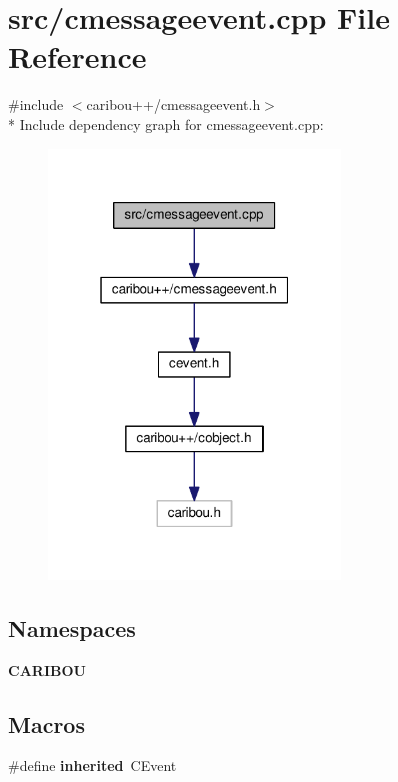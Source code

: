 \section{src/cmessageevent.cpp File Reference}
\label{cmessageevent_8cpp}
{\ttfamily \#include $<$caribou++/cmessageevent.\-h$>$}\\*
Include dependency graph for cmessageevent.\-cpp\-:\nopagebreak
\begin{figure}[H]
\begin{center}
\leavevmode
\includegraphics[width=220pt]{cmessageevent_8cpp__incl}
\end{center}
\end{figure}
\subsection*{Namespaces}
\begin{DoxyCompactItemize}
\item 
{\bf C\-A\-R\-I\-B\-O\-U}
\end{DoxyCompactItemize}
\subsection*{Macros}
\begin{DoxyCompactItemize}
\item 
\#define {\bf inherited}~C\-Event
\end{DoxyCompactItemize}


